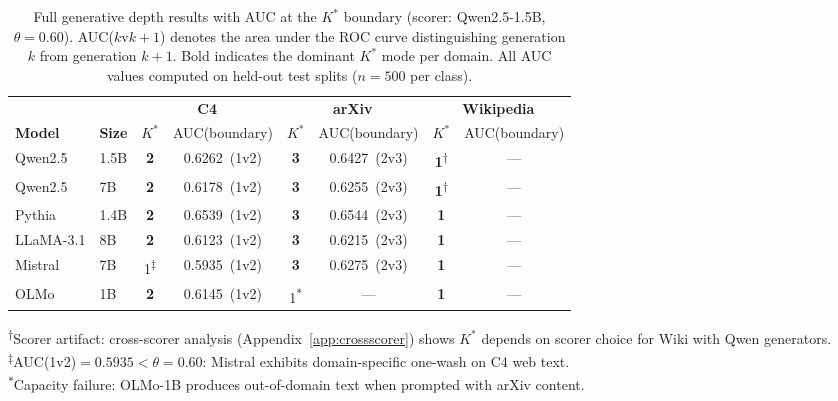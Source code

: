 \begin{table}[t]
\centering
\caption{Full generative depth results with AUC at the $K^*$ boundary (scorer: Qwen2.5-1.5B, $\theta{=}0.60$). AUC($k$v$k{+}1$) denotes the area under the ROC curve distinguishing generation $k$ from generation $k{+}1$. Bold indicates the dominant $K^*$ mode per domain. All AUC values computed on held-out test splits ($n{=}500$ per class).}
\label{tab:domain_model_kstar_full}
{\small
\begin{tabular}{llcccccc}
\toprule
& & \multicolumn{2}{c}{\textbf{C4}} & \multicolumn{2}{c}{\textbf{arXiv}} & \multicolumn{2}{c}{\textbf{Wikipedia}} \\
\cmidrule(lr){3-4} \cmidrule(lr){5-6} \cmidrule(lr){7-8}
\textbf{Model} & \textbf{Size} & $K^*$ & AUC(boundary) & $K^*$ & AUC(boundary) & $K^*$ & AUC(boundary) \\
\midrule
Qwen2.5       & 1.5B & \textbf{2} & 0.6262~(1v2) & \textbf{3} & 0.6427~(2v3) & \textbf{1}\textsuperscript{$\dagger$} & --- \\
Qwen2.5       & 7B   & \textbf{2} & 0.6178~(1v2) & \textbf{3} & 0.6255~(2v3) & \textbf{1}\textsuperscript{$\dagger$} & --- \\
Pythia        & 1.4B & \textbf{2} & 0.6539~(1v2) & \textbf{3} & 0.6544~(2v3) & \textbf{1} & --- \\
LLaMA-3.1    & 8B   & \textbf{2} & 0.6123~(1v2) & \textbf{3} & 0.6215~(2v3) & \textbf{1} & --- \\
Mistral       & 7B   & 1\textsuperscript{$\ddagger$} & 0.5935~(1v2) & \textbf{3} & 0.6275~(2v3) & \textbf{1} & --- \\
OLMo          & 1B   & \textbf{2} & 0.6145~(1v2) & 1\textsuperscript{$*$} & --- & \textbf{1} & --- \\
\bottomrule
\end{tabular}
}
\vspace{2pt}

{\footnotesize
\textsuperscript{$\dagger$}Scorer artifact: cross-scorer analysis (Appendix~\ref{app:crossscorer}) shows $K^*$ depends on scorer choice for Wiki with Qwen generators.\\
\textsuperscript{$\ddagger$}AUC(1v2)${=}0.5935{<}\theta{=}0.60$: Mistral exhibits domain-specific one-wash on C4 web text.\\
\textsuperscript{$*$}Capacity failure: OLMo-1B produces out-of-domain text when prompted with arXiv content.
}
\end{table}
